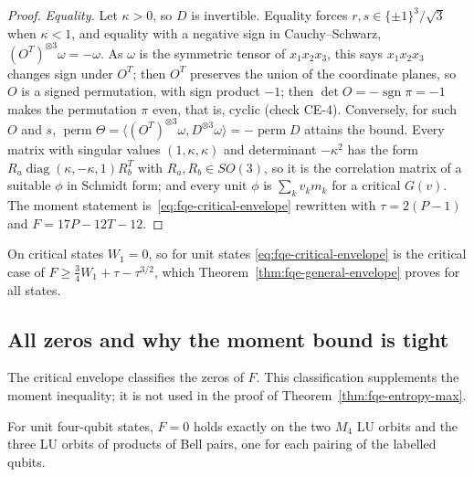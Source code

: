 \begin{proof}
\emph{Equality.} Let $\kappa>0$, so $D$ is invertible. Equality forces $r,s\in\{\pm1\}^3/\sqrt3$ when $\kappa<1$, and
equality with a negative sign in Cauchy--Schwarz, $(O^T)^{\otimes3}\omega=-\omega$. As $\omega$ is the symmetric tensor of
$x_1x_2x_3$, this says $x_1x_2x_3$ changes sign under $O^T$; then $O^T$ preserves the union of the coordinate planes, so $O$
is a signed permutation, with sign product $-1$; then $\det O=-\operatorname{sgn}\pi=-1$ makes the permutation $\pi$
even, that is, cyclic (check CE-4). Conversely, for such
$O$ and $s$, $\operatorname{perm}\Theta=\langle(O^T)^{\otimes3}\omega,D^{\otimes3}\omega\rangle=-\operatorname{perm}D$ attains the
bound. Every matrix with singular values $(1,\kappa,\kappa)$ and determinant $-\kappa^2$ has the form
$R_a\operatorname{diag}(\kappa,-\kappa,1)R_b^T$ with $R_a,R_b\in SO(3)$, so it is the correlation matrix of a suitable
$\phi$ in Schmidt form; and every unit $\phi$ is $\sum_kv_km_k$ for a critical $G(v)$.
The moment statement is~\eqref{eq:fqe-critical-envelope} rewritten with $\tau=2(P-1)$ and $F=17P-12T-12$.
\end{proof}

On critical states $W_1=0$, so for unit states \eqref{eq:fqe-critical-envelope} is the critical case of
$F\ge\frac34W_1+\tau-\tau^{3/2}$, which Theorem~\ref{thm:fqe-general-envelope} proves for all states.

\subsection{All zeros and why the moment bound is tight}\label{sec:fqe-sextic_identity-all-zeros-and-why-the-moment-bound-is-tight}

The critical envelope classifies the zeros of $F$. This classification supplements the moment inequality; it is
not used in the proof of Theorem~\ref{thm:fqe-entropy-max}.

\begin{proposition}\label{prop:fqe-moment-zeros}
For unit four-qubit states, $F=0$ holds exactly on the two $M_4$ LU orbits and the three LU orbits
of products of Bell pairs, one for each pairing of the labelled qubits.
\end{proposition}

